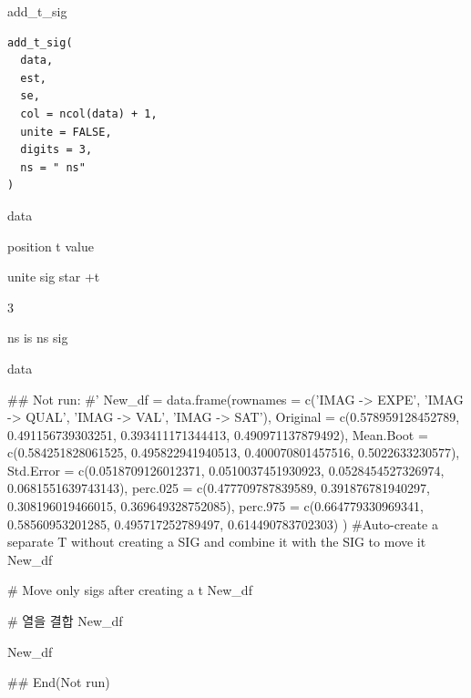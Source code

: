 \documentclass[a4paper]{book}
\begin{document}
%
\begin{Description}
add\_t\_sig
\end{Description}
%
\begin{Usage}
\begin{verbatim}
add_t_sig(
  data,
  est,
  se,
  col = ncol(data) + 1,
  unite = FALSE,
  digits = 3,
  ns = " ns"
)
\end{verbatim}
\end{Usage}
%
\begin{Arguments}
\begin{ldescription}
\item[\code{data}] data

\item[\code{col}] position t value

\item[\code{unite}] unite sig star +t

\item[\code{digits}] 3

\item[\code{ns}] ns is ns sig
\end{ldescription}
\end{Arguments}
%
\begin{Value}
data
\end{Value}
%
\begin{Examples}
\begin{ExampleCode}

\#\# Not run: 
#'
New_df = data.frame(rownames = c('IMAG -> EXPE', 'IMAG -> QUAL', 'IMAG -> VAL', 'IMAG -> SAT'),
  Original = c(0.578959128452789, 0.491156739303251, 0.393411171344413, 0.490971137879492),
 Mean.Boot = c(0.584251828061525, 0.495822941940513, 0.400070801457516, 0.5022633230577),
 Std.Error = c(0.0518709126012371, 0.0510037451930923, 0.0528454527326974, 0.0681551639743143),
 perc.025 = c(0.477709787839589, 0.391876781940297, 0.308196019466015, 0.369649328752085),
  perc.975 = c(0.664779330969341, 0.58560953201285, 0.495717252789497, 0.614490783702303)
)
#Auto-create a separate T without creating a SIG and combine it with the SIG to move it
New_df %


# Move only sigs after creating a t
New_df %

# 열을 결합
New_df %

New_df %


## End(Not run)
\end{ExampleCode}
\end{Examples}
\end{document}
